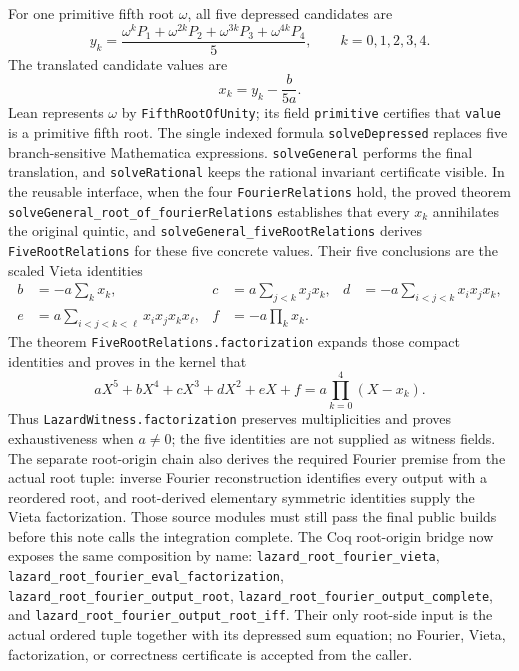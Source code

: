 \documentclass[11pt,a4paper,oneside]{article}
\newcommand{\lean}[1]{\nolinkurl{#1}}
\begin{document}
For one primitive fifth root $\omega$, all five depressed candidates are
\begin{equation}\label{eq:dft}
 y_k=\frac{\omega^kP_1+\omega^{2k}P_2+
                   \omega^{3k}P_3+\omega^{4k}P_4}{5},
 \qquad k=0,1,2,3,4.
\end{equation}
The translated candidate values are
\[
 x_k=y_k-\frac{b}{5a}.
\]
Lean represents $\omega$ by \lean{FifthRootOfUnity}; its field
\lean{primitive} certifies that \lean{value} is a primitive fifth root.  The
single indexed formula \lean{solveDepressed} replaces five branch-sensitive
Mathematica expressions.  \lean{solveGeneral} performs the final translation,
and \lean{solveRational} keeps the rational invariant certificate visible.
In the reusable interface, when the four \lean{FourierRelations} hold, the proved theorem
\lean{solveGeneral_root_of_fourierRelations} establishes that every $x_k$
annihilates the original quintic, and
\lean{solveGeneral_fiveRootRelations} derives \lean{FiveRootRelations} for
these five concrete values.  Their five conclusions are the scaled Vieta
identities
\begin{align*}
b&=-a\sum_k x_k,&
c&=a\sum_{j<k}x_jx_k,&
d&=-a\sum_{i<j<k}x_ix_jx_k,\\
e&=a\sum_{i<j<k<\ell}x_ix_jx_kx_\ell,&
f&=-a\prod_k x_k.
\end{align*}
The theorem \lean{FiveRootRelations.factorization} expands those compact
identities and proves in the kernel that
\[
 aX^5+bX^4+cX^3+dX^2+eX+f
   =a\prod_{k=0}^{4}(X-x_k).
\]
Thus \lean{LazardWitness.factorization} preserves multiplicities and proves
exhaustiveness when $a\ne0$; the five identities are not supplied as witness
fields.  The separate root-origin chain also derives the required Fourier
premise from the actual root tuple: inverse Fourier reconstruction
identifies every output with a reordered root, and root-derived elementary
symmetric identities supply the Vieta factorization.  Those source modules
must still pass the final public builds before this note calls the integration
complete.  The Coq root-origin bridge now exposes the same composition by
name: \lean{lazard_root_fourier_vieta},
\lean{lazard_root_fourier_eval_factorization},
\lean{lazard_root_fourier_output_root},
\lean{lazard_root_fourier_output_complete}, and
\lean{lazard_root_fourier_output_root_iff}.  Their only root-side input is the
actual ordered tuple together with its depressed sum equation; no Fourier,
Vieta, factorization, or correctness certificate is accepted from the caller.
\end{document}
